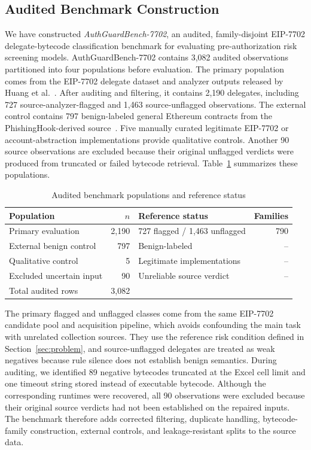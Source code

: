 \documentclass[conference]{IEEEtran}
\begin{document}
\subsection{Audited Benchmark Construction}
We have constructed {\it AuthGuardBench-7702}, an audited, family-disjoint EIP-7702 delegate-bytecode classification benchmark for evaluating pre-authorization risk screening models.
AuthGuardBench-7702 contains 3,082 audited observations partitioned into four populations before evaluation. The primary population comes from the EIP-7702 delegate dataset and analyzer outputs released by Huang et al.~\cite{huang2026darkside}. After auditing and filtering, it contains 2,190 delegates, including 727 source-analyzer-flagged and 1,463 source-unflagged observations. The external control contains 797 benign-labeled general Ethereum contracts from the PhishingHook-derived source~\cite{phishinghook2025}. Five manually curated legitimate EIP-7702 or account-abstraction implementations provide qualitative controls. Another 90 source observations are excluded because their original unflagged verdicts were produced from truncated or failed bytecode retrieval. Table~\ref{tab:dataset} summarizes these populations.

\begin{table}[t]
\centering
\caption{Audited benchmark populations and reference status}
\label{tab:dataset}
\scriptsize
\begin{tabularx}{\columnwidth}{@{}X r X r@{}}
\toprule
Population & $n$ & Reference status & Families \\
\midrule
Primary evaluation & 2,190 & 727 flagged / 1,463 unflagged & 790 \\
External benign control & 797 & Benign-labeled & -- \\
Qualitative control & 5 & Legitimate implementations & -- \\
Excluded uncertain input & 90 & Unreliable source verdict & -- \\
\midrule
Total audited rows & 3,082 & & \\
\bottomrule
\end{tabularx}
\end{table}

The primary flagged and unflagged classes come from the same EIP-7702 candidate pool and acquisition pipeline, which avoids confounding the main task with unrelated collection sources. They use the reference risk condition defined in Section~\ref{sec:problem}, and source-unflagged delegates are treated as weak negatives because rule silence does not establish benign semantics. During auditing, we identified 89 negative bytecodes truncated at the Excel cell limit and one timeout string stored instead of executable bytecode. Although the corresponding runtimes were recovered, all 90 observations were excluded because their original source verdicts had not been established on the repaired inputs. The benchmark therefore adds corrected filtering, duplicate handling, bytecode-family construction, external controls, and leakage-resistant splits to the source data.
\end{document}
